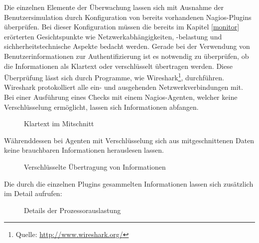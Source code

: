 Die einzelnen Elemente der Überwachung lassen sich mit Ausnahme der Benutzersimulation durch Konfiguration von bereits vorhandenen Nagios-Plugins überprüfen.
Bei dieser Konfiguration müssen die bereits im Kapitel \ref{monitor} erörterten Gesichtspunkte wie Netzwerkabhängigkeiten, -belastung und sichherheitstechnische Aspekte bedacht werden.
Gerade bei der Verwendung von Benutzerinformationen zur Authentifizierung ist es notwendig zu überprüfen, ob die Informationen als Klartext oder verschlüsselt übertragen werden.
Diese Überprüfung lässt sich durch Programme, wie Wireshark\footnote{Quelle: \url{http://www.wireshark.org/}}, durchführen.
Wireshark protokolliert alle ein- und ausgehenden Netzwerkverbindungen mit.
Bei einer Ausführung eines Checks mit einem Nagios-Agenten, welcher keine Verschlüsselung ermöglicht, lassen sich Informationen abfangen.
\begin{figure}[ht]
	\centering
		\caption{Klartext im Mitschnitt}
		\label{klartxt}
\end{figure}

Währenddessen bei Agenten mit Verschlüsselung sich aus mitgeschnittenen Daten keine brauchbaren Informationen herauslesen lassen.
\begin{figure}[ht]
	\centering
		\caption{Verschlüsselte Übertragung von Informationen}
		\label{ssltxt}
\end{figure}

Die durch die einzelnen Plugins gesammelten Informationen lassen sich zusätzlich im Detail aufrufen:

\begin{figure}[ht]
	\centering
		\caption{Details der Prozessorauslastung}
		\label{cpuload}
\end{figure}


